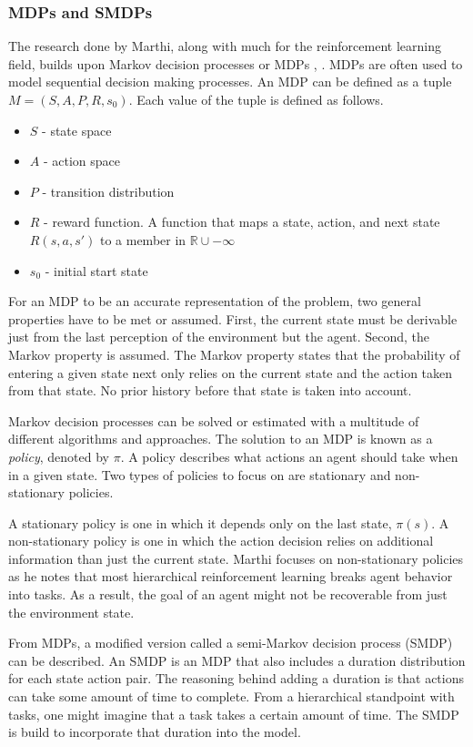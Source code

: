 \documentclass[jair,twoside,11pt,theapa]{article}
\begin{document}
\subsubsection{MDPs and SMDPs}
The research done by Marthi, along with much for the reinforcement learning field, builds upon Markov decision processes or MDPs \cite{Puterman:1994}, \cite{bertsekas:1996}. MDPs are often used to model sequential decision making processes. An MDP can be defined as a tuple $M = (S, A, P, R, s_0)$. Each value of the tuple is defined as follows. 
\begin{itemize}
	\item $S$ - state space
	\item $A$ - action space
	\item $P$ - transition distribution
	\item $R$ - reward function. A function that maps a state, action, and next state $R(s,a,s')$ to a member in $\mathbb{R} \cup -\infty$
	\item $s_0$ - initial start state
\end{itemize}

For an MDP to be an accurate representation of the problem, two general properties have to be met or assumed. First, the current state must be derivable just from the last perception of the environment but the agent. Second, the Markov property is assumed. The Markov property states that the probability of entering a given state next only relies on the current state and the action taken from that state. No prior history before that state is taken into account. 

Markov decision processes can be solved or estimated with a multitude of different algorithms and approaches. The solution to an MDP is known as a \textit{policy}, denoted by $\pi$. A policy describes what actions an agent should take when in a given state. Two types of policies to focus on are stationary and non-stationary policies. 

A stationary policy is one in which it depends only on the last state, $\pi(s)$. A non-stationary policy is one in which the action decision relies on additional information than just the current state. Marthi focuses on non-stationary policies as he notes that most hierarchical reinforcement learning breaks agent behavior into tasks. As a result, the goal of an agent might not be recoverable from just the environment state. 

From MDPs, a modified version called a semi-Markov decision process (SMDP) can be described. An SMDP is an MDP that also includes a duration distribution for each state action pair. The reasoning behind adding a duration is that actions can take some amount of time to complete. From a hierarchical standpoint with tasks, one might imagine that a task takes a certain amount of time. The SMDP is build to incorporate that duration into the model. 
\end{document}
